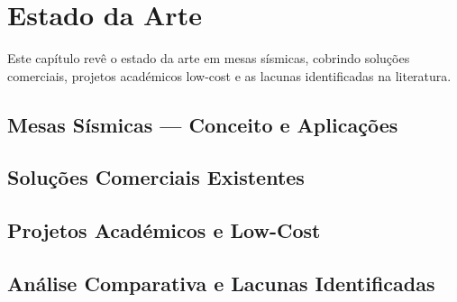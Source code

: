 

\chapter{Estado da Arte}
\label{chapter:state-of-the-art}

\begin{introduction}
Este capítulo revê o estado da arte em mesas sísmicas, cobrindo soluções comerciais, projetos académicos low-cost e as lacunas identificadas na literatura.
\end{introduction}



\section{Mesas Sísmicas --- Conceito e Aplicações}
\label{sec:mesas-sismicas}


\section{Soluções Comerciais Existentes}
\label{sec:solucoes-comerciais}


\section{Projetos Académicos e Low-Cost}
\label{sec:projetos-academicos}


\section{Análise Comparativa e Lacunas Identificadas}
\label{sec:analise-comparativa}


